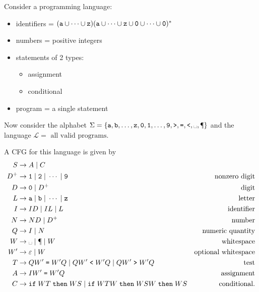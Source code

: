 \documentclass{notes}
\begin{document}
\newpage

\begin{eg}
  Consider a programming language: 
  \begin{itemize}
    \item identifiers = $(\verb~a~ \cup \cdots \cup \verb~z~) (\verb~a~ \cup \cdots \cup \verb~z~ \cup \verb~0~ \cup \cdots \cup \verb~0~)^*$

    \item numbers = positive integers

    \item statements of 2 types: 

    \begin{itemize}
      \item assignment

      \item conditional
    \end{itemize}
    
    \item program = a single statement
  \end{itemize}
  
  Now consider the alphabet $\Sigma = \left \{ \verb~a~, \verb~b~, \dots, \verb~z~, \verb~0~, \verb~1~, \dots, \verb~9~, \verb~>~, \verb~=~, \verb~<~, \text{\textvisiblespace}, \verb~¶~ \right \}$ and the language $\mathcal L = \text{ all valid programs}$.
  
  A CFG for this language is given by 
  \begin{align*}
    S &\to A \; | \; C \\ 
    D^+ &\to  \verb~1~ \; | \; \verb~2~ \; | \; \cdots \; | \; \verb~9~ & \text{nonzero digit} \\
    D &\to \verb~0~ \; | \; D^+ & \text{digit} \\ 
    L &\to \verb~a~ \; | \; \verb~b~ \; | \; \cdots \; | \; \verb~z~ & \text{letter} \\ 
    I &\to I D \; | \; I L \; | \; L & \text{identifier} \\ 
    N &\to N D \; | \; D^+ & \text{number} \\ 
    Q &\to I \; | \; N & \text{numeric quantity} \\ 
    W &\to \text{\textvisiblespace} \; | \; \verb~¶~ \; | \; W & \text{whitespace} \\ 
    W' &\to \varepsilon \; | \; W & \text{optional whitespace} \\ 
    T &\to Q W' \; \verb~=~ \; W' Q \; | \; Q W' \; \verb~<~ \; W' Q \; | \; Q W' \; \verb~>~ \; W' Q & \text{test} \\ 
    A &\to I W' \; \verb~=~ \; W' Q & \text{assignment} \\ 
    C &\to \verb~if~ \; W T \; \verb~then~ \; W S \; | \; \verb~if~ \; W T W \; \verb~then~ \; W S W \; \verb~then~ \; W S & \text{conditional}.
  \end{align*}
\end{eg}
\end{document}
